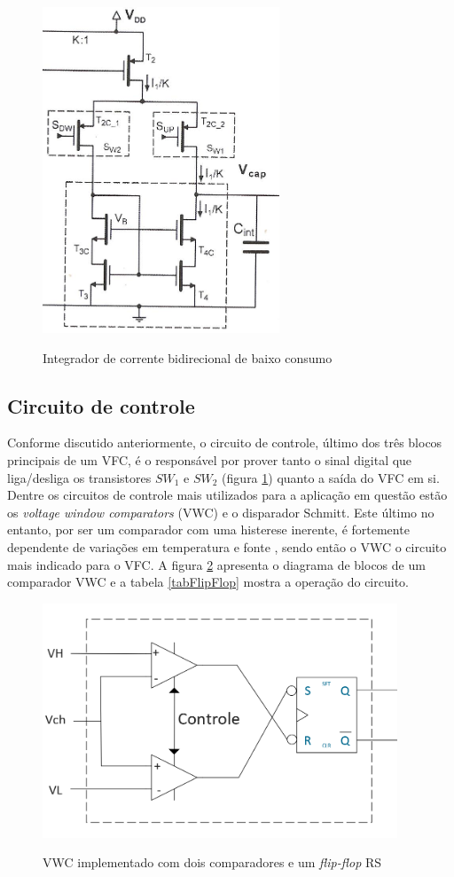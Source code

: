 \documentclass[
	12pt,				%
	oneside,			%
	a4paper,			%
	english,			%
	french,				%
	spanish,			%
	brazil				%
	]{abntex2}
\begin{document}
\begin{figure}[!ht]
  \centering
  \includegraphics[width=200pt]{integrador.png}\\
  \caption{Integrador de corrente bidirecional de baixo consumo}\label{integrador}
\end{figure}

\subsection{Circuito de controle}

Conforme discutido anteriormente, o circuito de controle, último dos três blocos principais de um VFC, é o responsável por prover tanto o sinal digital que liga/desliga os transistores \(SW_1\) e \(SW_2\) (figura \ref{integrador}) quanto a saída do VFC em si. Dentre os circuitos de controle mais utilizados para a aplicação em questão estão os \textit{voltage window comparators} (VWC) e o disparador Schmitt.
Este último no entanto, por ser um comparador com uma histerese inerente, é fortemente dependente de variações em temperatura e fonte \cite{VFCbook}, sendo então o VWC o circuito mais indicado para o VFC.
A figura \ref{VWC} apresenta o diagrama de blocos de um comparador VWC e a tabela \ref{tabFlipFlop} mostra a operação do circuito.

\begin{figure}[!ht]
  \centering
  \includegraphics[width=300pt]{VWC.PNG}\\
  \caption{VWC implementado com dois comparadores e um \textit{flip-flop} RS}\label{VWC}
\end{figure}
\end{document}
